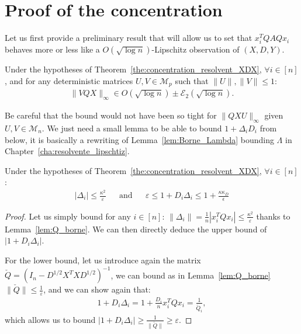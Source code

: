 \documentclass[a4papaer, titlepage]{book}
\begin{document}
\section{Proof of the concentration}\label{app:preuve_concentration_x_iQAQx_i}

Let us first provide a preliminary result that will allow us to set that $x_i^TQAQx_i$ behaves more or less like a $O(\sqrt{\log n})$-Lipschitz observation of $(X,D,Y)$.

\begin{lemma}\label{lem:concentration_norme_infinie_Qx}
  Under the hypotheses of Theorem~\ref{the:concentration_resolvent_XDX}, $\forall i \in[n]$, and for any deterministic matrices $U,V \in \mathcal M_{p}$ such that $\|U\|,\|V\|\leq 1$:
  \begin{align*}
    \|  VQ  X\|_\infty
    \in O \left(\sqrt{\log n}\right) \pm  \mathcal E_2 \left(\sqrt{\log n}\right).
  \end{align*}
\end{lemma}
Be careful that the bound would not have been so tight for $\|  Q  XU\|_\infty$ given $U,V \in \mathcal M_{n}$. 
We just need a small lemma to be able to bound $1 + \Delta_i D_i$ from below, it is basically a rewriting of Lemma~\ref{lem:Borne_Lambda} bounding $\Lambda$ in Chapter~\ref{cha:resolvente_lipschtiz}.
\begin{lemma}\label{lem:borne_1_D_Delta}
  Under the hypotheses of Theorem~\ref{the:concentration_resolvent_XDX}, $\forall i \in[n]$:
  \begin{align*}
   |\Delta_i| \leq \frac{\kappa^2}{\varepsilon}&
   &\text{and}&
   &\varepsilon \leq 1 + D_i \Delta_i \leq 1+ \frac{\kappa \kappa_D}{\epsilon}
  \end{align*}
\end{lemma}
\begin{proof}
  Let us simply bound for any $i\in [n]$: $\|\Delta_i\| = \frac{1}{n} |x_i^T Qx_i | \leq \frac{\kappa^2}{\varepsilon} $ thanks to Lemma~\ref{lem:Q_borne}. We can then directly deduce the upper bound of $|1 +  D_i \Delta_i|$.
  
  For the lower bound, let us introduce again the matrix $\check Q = (I_n - D^{1/2}X^TXD^{1/2})^{-1}$, we can bound as in Lemma~\ref{lem:Q_borne} $\|\check Q\| \leq \frac{1}{\varepsilon}$, and we can show again that:
  \begin{align*}
    1 +  D_i \Delta_i = 1 +  \frac{D_i}{n} x_i^T Qx_i = \frac{1}{\check Q_i},
  \end{align*}
  which allows us to bound $|1 +  D_i \Delta_i| \geq \frac{1}{\|\check Q\|} \geq \varepsilon$.
\end{proof}
\end{document}
